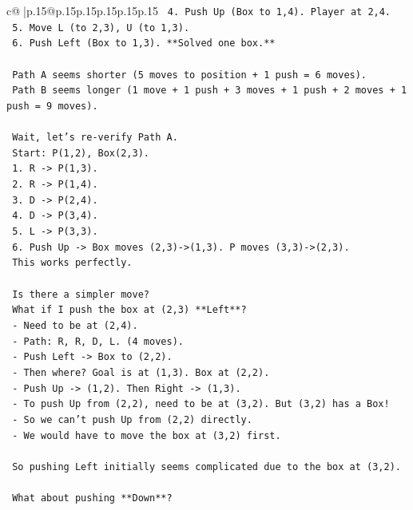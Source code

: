 \documentclass{article}
\begin{document}
{\begin{supertabular}{c@{$\;$}|p{.15\linewidth}@{}p{.15\linewidth}p{.15\linewidth}p{.15\linewidth}p{.15\linewidth}p{.15\linewidth}}
{{{\texttt{   4. Push Up (Box to 1,4). Player at 2,4.} \\
\texttt{   5. Move L (to 2,3), U (to 1,3).} \\
\texttt{   6. Push Left (Box to 1,3). **Solved one box.**} \\
\\ 
\texttt{   Path A seems shorter (5 moves to position + 1 push = 6 moves).} \\
\texttt{   Path B seems longer (1 move + 1 push + 3 moves + 1 push + 2 moves + 1 push = 9 moves).} \\
\\ 
\texttt{   Wait, let's re{-}verify Path A.} \\
\texttt{   Start: P(1,2), Box(2,3).} \\
\texttt{   1. R {-}> P(1,3).} \\
\texttt{   2. R {-}> P(1,4).} \\
\texttt{   3. D {-}> P(2,4).} \\
\texttt{   4. D {-}> P(3,4).} \\
\texttt{   5. L {-}> P(3,3).} \\
\texttt{   6. Push Up {-}> Box moves (2,3){-}>(1,3). P moves (3,3){-}>(2,3).} \\
\texttt{   This works perfectly.} \\
\\ 
\texttt{   Is there a simpler move?} \\
\texttt{   What if I push the box at (2,3) **Left**?} \\
\texttt{   {-} Need to be at (2,4).} \\
\texttt{   {-} Path: R, R, D, L. (4 moves).} \\
\texttt{   {-} Push Left {-}> Box to (2,2).} \\
\texttt{   {-} Then where? Goal is at (1,3). Box at (2,2).} \\
\texttt{   {-} Push Up {-}> (1,2). Then Right {-}> (1,3).} \\
\texttt{   {-} To push Up from (2,2), need to be at (3,2). But (3,2) has a Box!} \\
\texttt{   {-} So we can't push Up from (2,2) directly.} \\
\texttt{   {-} We would have to move the box at (3,2) first.} \\
\\ 
\texttt{   So pushing Left initially seems complicated due to the box at (3,2).} \\
\\ 
\texttt{   What about pushing **Down**?} \\
}}}
\end{supertabular}}
\end{document}
